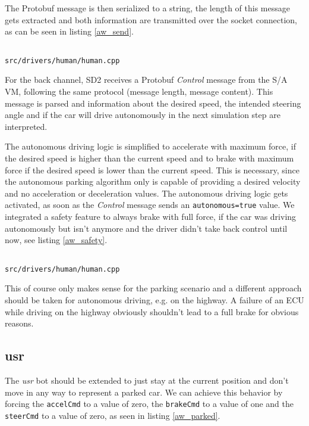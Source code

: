 \documentclass[paper=a4, fontsize=11pt]{scrreprt}
\begin{document}
The Protobuf message is then serialized to a string,
the length of this message gets extracted
and both information are transmitted over the socket connection,
as can be seen in listing \ref{aw_send}.

\begin{listing}[ht]
  \inputminted[firstline=352,linenos=true,lastline=363,gobble=4]{c++}{../../../simulators/speed-dreams/src/drivers/human/human.cpp}
  \caption{\texttt{src/drivers/human/human.cpp}}\label{aw_send}
\end{listing}

For the back channel, SD2 receives a Protobuf \textit{Control} message from the S/A VM,
following the same protocol (message length, message content).
This message is parsed and information about the desired speed,
the intended steering angle
and if the car will drive autonomously in the next simulation step are interpreted.

The autonomous driving logic is simplified to accelerate with maximum force,
if the desired speed is higher than the current speed
and to brake with maximum force if the desired speed is lower than the current speed.
This is necessary,
since the autonomous parking algorithm only is capable of providing a desired velocity
and no acceleration or deceleration values.
The autonomous driving logic gets activated,
as soon as the \textit{Control} message sends an \texttt{autonomous=true} value.
We integrated a safety feature to always brake with full force,
if the car was driving autonomously but isn't anymore
and the driver didn't take back control until now, see listing \ref{aw_safety}.

\begin{listing}[ht]
  \inputminted[firstline=422,linenos=true,lastline=426,gobble=6]{c++}{../../../simulators/speed-dreams/src/drivers/human/human.cpp}
  \caption{\texttt{src/drivers/human/human.cpp}}\label{aw_safety}
\end{listing}

This of course only makes sense for the parking scenario
and a different approach should be taken for autonomous driving, e.g. on the highway.
A failure of an ECU while driving on the highway obviously shouldn't lead to a full brake
for obvious reasons.

\subsection{usr}
The \textit{usr} bot should be extended to just stay at the current position
and don't move in any way to represent a parked car.
We can achieve this behavior by forcing the \texttt{accelCmd} to a value of zero,
the \texttt{brakeCmd} to a value of one and the \texttt{steerCmd} to a value of zero,
as seen in listing \ref{aw_parked}.
\end{document}
